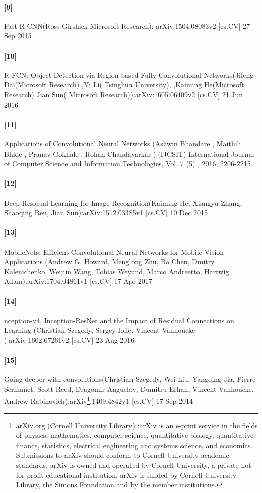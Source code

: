 \documentclass[12pt]{article}
\begin{document}
\paragraph*{[9]}
\label{figmesh9} Fast R-CNN(Ross Girshick
Microsoft Research): arXiv:1504.08083v2 [cs.CV] 27 Sep 2015
\paragraph*{[10]} R-FCN: Object Detection via Region-based Fully Convolutional Networks(Jifeng Dai(Microsoft Research) ,Yi Li( Tsinghua University),
,Kaiming He(Microsoft Research)
Jian Sun(
Microsoft Research)):arXiv:1605.06409v2 [cs.CV] 21 Jun 2016
\paragraph{[11]} Applications of Convolutional Neural Networks (Ashwin Bhandare
, Maithili Bhide
, Pranav Gokhale
, Rohan Chandavarkar
):(IJCSIT) International Journal of Computer Science and Information Technologies, Vol. 7 (5) , 2016, 2206-2215

\paragraph{[12]} Deep Residual Learning for Image Recognition(Kaiming He, Xiangyu Zhang, Shaoqing Ren, Jian Sun):arXiv:1512.03385v1 [cs.CV] 10 Dec 2015

\paragraph{[13]}MobileNets: Efficient Convolutional Neural Networks for Mobile Vision Applications (Andrew G. Howard, Menglong Zhu, Bo Chen, 
Dmitry Kalenichenko, Weijun Wang, 
Tobias Weyand, Marco Andreetto,  
Hartwig Adam):arXiv:1704.04861v1 [cs.CV] 17 Apr 2017

\paragraph{[14]}nception-v4, Inception-ResNet and
the Impact of Residual Connections on Learning (Christian Szegedy, Sergey Ioffe, Vincent Vanhoucke ):arXiv:1602.07261v2 [cs.CV] 23 Aug 2016

\paragraph{[15]}Going deeper with convolutions(Christian Szegedy, Wei Liu, Yangqing Jia, Pierre Sermanet, Scott Reed, Dragomir Anguelov, Dumitru Erhan, Vincent Vanhoucke, Andrew Rabinovich):arXiv\footnote{arXiv.org (Cornell Univercity Library) :arXiv is an e-print service in the fields of physics, mathematics, computer science, quantitative biology, quantitative finance, statistics, electrical engineering and systems science, and economics. Submissions to arXiv should conform to Cornell University academic standards. arXiv is owned and operated by Cornell University, a private not-for-profit educational institution. arXiv is funded by Cornell University Library, the Simons Foundation and by the member institutions.}:1409.4842v1 [cs.CV] 17 Sep 2014
\end{document}
